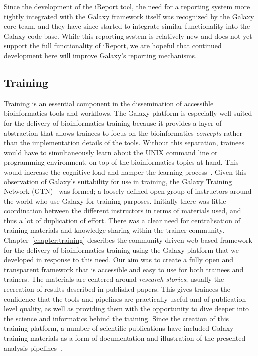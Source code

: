 Since the development of the iReport tool, the need for a reporting system more tightly integrated with the Galaxy framework itself was recognized by the Galaxy core team, and they have since started to integrate similar functionality into the Galaxy code base. While this reporting system is relatively new and does not yet support the full functionality of iReport, we are hopeful that continued development here will improve Galaxy's reporting mechanisms.

\subsection{Training}
Training is an essential component in the dissemination of accessible bioinformatics tools and workflows. The Galaxy platform is especially well-suited for the delivery of bioinformatics training because it provides a layer of abstraction that allows trainees to focus on the bioinformatics \emph{concepts} rather than the implementation details of the tools. Without this separation, trainees would have to simultaneously learn about the UNIX command line or programming environment, on top of the bioinformatics topics at hand. This would increase the cognitive load and hamper the learning process~\cite{paas2003cognitive}. Given this observation of Galaxy's suitability for use in training, the Galaxy Training Network (GTN)~\cite{url-gtn} was formed; a loosely-defined open group of instructors around the world who use Galaxy for training purposes. Initially there was little coordination between the different instructors in terms of materials used, and thus a lot of duplication of effort. There was a clear need for centralisation of training materials and knowledge sharing within the trainer community. Chapter~\ref{chapter:training} describes the community-driven web-based framework for the delivery of bioinformatics training using the Galaxy platform that we developed in response to this need.
Our aim was to create a fully open and transparent framework that is accessible and easy to use for both trainees and trainers. The materials are centered around \emph{research stories}; usually the recreation of results described in published papers. This gives trainees the confidence that the tools and pipelines are practically useful and of publication-level quality, as well as providing them with the opportunity to dive deeper into the science and informatics behind the training. Since the creation of this training platform, a number of scientific publications have included Galaxy training materials as a form of documentation and illustration of the presented analysis pipelines~\cite{gruning2017rna,blank2018disseminating,batut2017asaim,hiltemann2018galaxy}.

